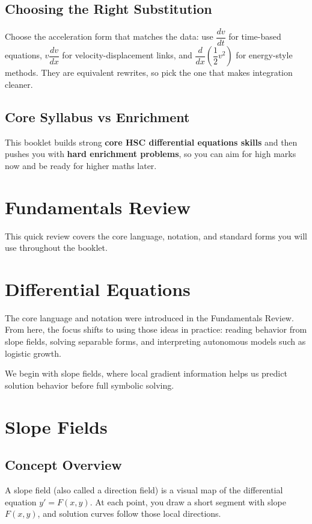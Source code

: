 \documentclass[12pt]{article}
\begin{document}
\subsection{Choosing the Right Substitution}
Choose the acceleration form that matches the data: use $\dfrac{dv}{dt}$ for time-based equations, $v\dfrac{dv}{dx}$ for velocity-displacement links, and $\dfrac{d}{dx}\!\left(\dfrac{1}{2}v^2\right)$ for energy-style methods. They are equivalent rewrites, so pick the one that makes integration cleaner.

\subsection{Core Syllabus vs Enrichment}
This booklet builds strong \textbf{core HSC differential equations skills} and then pushes you with \textbf{hard enrichment problems}, so you can aim for high marks now and be ready for higher maths later.

\newpage
\section{Fundamentals Review}
This quick review covers the core language, notation, and standard forms you will use throughout the booklet.



\newpage
\section{Differential Equations}
The core language and notation were introduced in the Fundamentals Review. From here, the focus shifts to using those ideas in practice: reading behavior from slope fields, solving separable forms, and interpreting autonomous models such as logistic growth.

We begin with slope fields, where local gradient information helps us predict solution behavior before full symbolic solving.

\section{Slope Fields}

\subsection{Concept Overview}
A slope field (also called a direction field) is a visual map of the differential equation $y'=F(x,y)$. At each point, you draw a short segment with slope $F(x,y)$, and solution curves follow those local directions.
\end{document}
